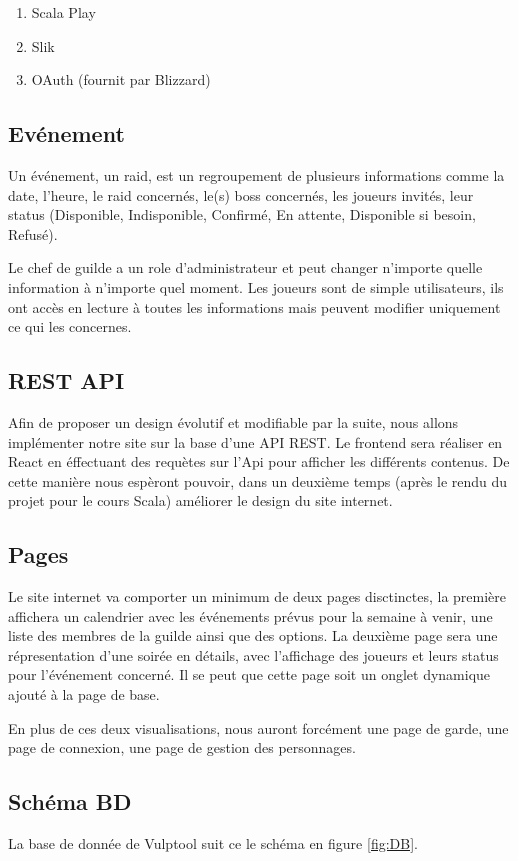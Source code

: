 \documentclass[a4paper, 11pt]{article}
\begin{document}
	\begin{enumerate}
		\item Scala Play
		\item Slik
		\item OAuth (fournit par Blizzard)
	\end{enumerate}

\subsection{Evénement}
Un événement, un raid, est un regroupement de plusieurs informations comme la date, l'heure, le raid concernés, le(s) boss concernés, les joueurs invités, leur status (Disponible, Indisponible, Confirmé, En attente, Disponible si besoin, Refusé). 

Le chef de guilde a un role d'administrateur et peut changer n'importe quelle information à n'importe quel moment. Les joueurs sont de simple utilisateurs, ils ont accès en lecture à toutes les informations mais peuvent modifier uniquement ce qui les concernes.

\subsection{REST API}
Afin de proposer un design évolutif et modifiable par la suite, nous allons implémenter notre site sur la base d'une API REST. Le frontend sera réaliser en React en éffectuant des requètes sur l'Api pour afficher les différents contenus. De cette manière nous espèront pouvoir, dans un deuxième temps (après le rendu du projet pour le cours Scala) améliorer le design du site internet.

\subsection{Pages}
Le site internet va comporter un minimum de deux pages disctinctes, la première affichera un calendrier avec les événements prévus pour la semaine à venir, une liste des membres de la guilde ainsi que des options. La deuxième page sera une répresentation d'une soirée en détails, avec l'affichage des joueurs et leurs status pour l'événement concerné. Il se peut que cette page soit un onglet dynamique ajouté à la page de base. 

En plus de ces deux visualisations, nous auront forcément une page de garde, une page de connexion, une page de gestion des personnages.

\subsection{Schéma BD}
La base de donnée de Vulptool suit ce le schéma en figure \ref{fig:DB}.
\end{document}
